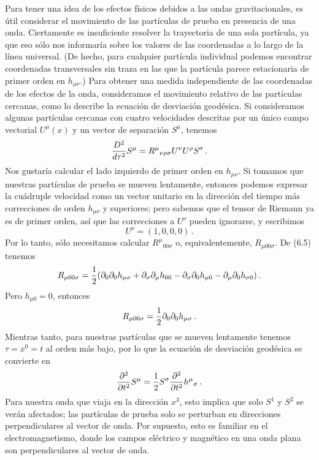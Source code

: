 \documentclass[11pt,b5paper,openany,twoside]{book}
\newcommand{\mn}{{\mu\nu}}
\newcommand{\p}[1]{{\partial_{#1}}}
\begin{document}
Para tener una idea de los efectos físicos debidos a las ondas gravitacionales, es útil considerar el movimiento de las partículas de prueba en presencia de una onda.
Ciertamente es insuficiente resolver la trayectoria de una sola partícula, ya que eso sólo nos informaría sobre los valores de las coordenadas a lo largo de la línea universal.
(De hecho, para cualquier partícula individual podemos encontrar coordenadas transversales sin traza en las que la partícula parece estacionaria de primer orden en $h_\mn$.)
Para obtener una medida independiente de las coordenadas de los efectos de la onda, consideramos el movimiento relativo de las partículas cercanas, como lo describe la ecuación de desviación geodésica.
Si consideramos algunas partículas cercanas con cuatro velocidades descritas por un único campo vectorial $U^\mu(x)$ y un vector de separación $S^\mu$, tenemos
\begin{equation}
{{D^2}\over{d\tau^2}}S^\mu = R^\mu{}_{\nu\rho\sigma}
U^\nu U^\rho S^\sigma\,.\label{6.58}
\end{equation}
Nos gustaría calcular el lado izquierdo de primer orden en $h_\mn$.
Si tomamos que nuestras partículas de prueba se mueven lentamente, entonces podemos expresar la cuádruple velocidad como un vector unitario en la dirección del tiempo más correcciones de orden $h_\mn$ y superiores; pero sabemos que el tensor de Riemann ya es de primer orden, así que las correcciones a $U^\nu$ pueden ignorarse, y escribimos
\begin{equation}
U^\nu = (1,0,0,0)\,.\label{6.59}
\end{equation}
Por lo tanto, sólo necesitamos calcular $R^\mu{}_{00\sigma}$ o, equivalentemente, $R_{\mu 00\sigma}$.
De (6.5) tenemos
\begin{equation}
R_{\mu 00\sigma}={1\over 2}(\p0\p0 h_{\mu\sigma} + \p\sigma
\p\mu h_{00} - \p\sigma\p0 h_{\mu 0} - \p\mu\p0 h_{\sigma 0})
\,.\label{6.60}
\end{equation}
Pero $h_{\mu 0}=0$, entonces
\begin{equation}
R_{\mu 00\sigma}={1\over 2}\p0\p0 h_{\mu\sigma}\,.\label{6.61}
\end{equation}
Mientras tanto, para nuestras partículas que se mueven lentamente tenemos $\tau=x^0=t$ al orden más bajo, por lo que la ecuación de desviación geodésica se convierte en
\begin{equation}
{{\partial^2}\over{\partial t^2}}S^\mu = {1\over 2}S^\sigma
{{\partial^2}\over{\partial t^2}} h^\mu{}_\sigma\,.\label{6.62}
\end{equation}
Para nuestra onda que viaja en la dirección $x^3$, esto implica que solo $S^1$ y $S^2$ se verán afectados; las partículas de prueba solo se perturban en direcciones perpendiculares al vector de onda.
Por supuesto, esto es familiar en el electromagnetismo, donde los campos eléctrico y magnético en una onda plana son perpendiculares al vector de onda.
\end{document}
